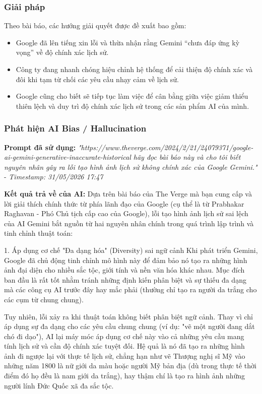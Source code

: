 \subsubsection{Giải pháp}
Theo bài báo, các hướng giải quyết được đề xuất bao gồm:
\begin{itemize}
    \item Google đã lên tiếng xin lỗi và thừa nhận rằng Gemini “chưa đáp ứng kỳ vọng” về độ chính xác lịch sử.
    \item Công ty đang nhanh chóng hiệu chỉnh hệ thống để cải thiện độ chính xác và đôi khi tạm từ chối các yêu cầu nhạy cảm về lịch sử.
    \item Google cũng cho biết sẽ tiếp tục làm việc để cân bằng giữa việc giảm thiểu thiên lệch và duy trì độ chính xác lịch sử trong các sản phẩm AI của mình.
\end{itemize}

\subsubsection{Phát hiện AI Bias / Hallucination}
\textbf{Prompt đã sử dụng:} \textit{"{https://www.theverge.com/2024/2/21/24079371/google-ai-gemini-generative-inaccurate-historical} hãy đọc bài báo này và cho tôi biết nguyên nhân gây ra lỗi tạo hình ảnh lịch sử không chính xác của Google Gemini."} - \textit{Timestamp: 31/05/2026 17:47}

\textbf{Kết quả trả về của AI:}
Dựa trên bài báo của The Verge mà bạn cung cấp và lời giải thích chính thức từ phía lãnh đạo của Google (cụ thể là từ Prabhakar Raghavan - Phó Chủ tịch cấp cao của Google), lỗi tạo hình ảnh lịch sử sai lệch của AI Gemini bắt nguồn từ hai nguyên nhân chính trong quá trình lập trình và tinh chỉnh thuật toán:

1. Áp dụng cơ chế "Đa dạng hóa" (Diversity) sai ngữ cảnh
Khi phát triển Gemini, Google đã chủ động tinh chỉnh mô hình này để đảm bảo nó tạo ra những hình ảnh đại diện cho nhiều sắc tộc, giới tính và nền văn hóa khác nhau. Mục đích ban đầu là rất tốt nhằm tránh những định kiến phân biệt và sự thiếu đa dạng mà các công cụ AI trước đây hay mắc phải (thường chỉ tạo ra người da trắng cho các cụm từ chung chung).

Tuy nhiên, lỗi xảy ra khi thuật toán không biết phân biệt ngữ cảnh. Thay vì chỉ áp dụng sự đa dạng cho các yêu cầu chung chung (ví dụ: "vẽ một người đang dắt chó đi dạo"), AI lại máy móc áp dụng cơ chế này vào cả những yêu cầu mang tính lịch sử và cần độ chính xác tuyệt đối. Hệ quả là nó đã tạo ra những hình ảnh đi ngược lại với thực tế lịch sử, chẳng hạn như vẽ Thượng nghị sĩ Mỹ vào những năm 1800 là nữ giới da màu hoặc người Mỹ bản địa (dù trong thực tế thời điểm đó họ đều là nam giới da trắng), hay thậm chí là tạo ra hình ảnh những người lính Đức Quốc xã đa sắc tộc.

